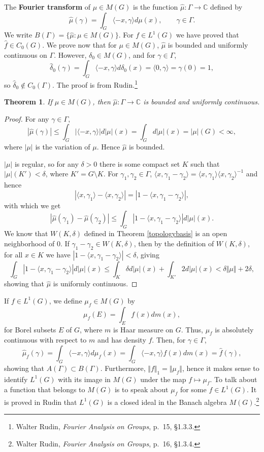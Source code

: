 \documentclass{article}
\newcommand{\inner}[2]{\langle #1, #2 \rangle}
\newcommand{\norm}[1]{\Vert #1 \Vert}
\newtheorem{theorem}{Theorem}
\begin{document}
The \textbf{Fourier transform} of $\mu \in M(G)$ is the function $\hat{\mu}:\Gamma \to \mathbb{C}$ defined by
\[
\hat{\mu}(\gamma) = \int_G \inner{-x}{\gamma} d\mu(x), \qquad \gamma \in \Gamma.
\]
We write $B(\Gamma)=\{\hat{\mu}:\mu \in M(G)\}$.
For $f \in L^1(G)$ we have proved that $\hat{f} \in C_0(G)$. We prove now that for $\mu \in M(G)$, $\hat{\mu}$ is bounded and uniformly continuous
on $\Gamma$. However, $\delta_0 \in M(G)$, and for $\gamma \in \Gamma$,
\[
\hat{\delta}_0(\gamma) = \int_G \inner{-x}{\gamma} d\delta_0(x) = \inner{0}{\gamma} = \gamma(0) = 1,
\] 
so $\hat{\delta}_0 \not \in C_0(\Gamma)$. The proof is from Rudin.\footnote{Walter Rudin, {\em Fourier Analysis on Groups},
p.~15, \S 1.3.3.}

\begin{theorem}
If $\mu \in M(G)$, then $\hat{\mu}:\Gamma \to \mathbb{C}$ is bounded and uniformly continuous.
\end{theorem}
\begin{proof}
For any $\gamma \in \Gamma$, 
\[
|\hat{\mu}(\gamma)| \leq \int_G |\inner{-x}{\gamma}| d|\mu|(x) = \int_G d|\mu|(x) = |\mu|(G)<\infty,
\]
where $|\mu|$ is the variation of $\mu$. Hence $\hat{\mu}$ is bounded.

$|\mu|$ is regular, so for any $\delta>0$ there is some compact set $K$ such that $|\mu|(K')<\delta$, where $K'=G \setminus K$.
For $\gamma_1,\gamma_2 \in \Gamma$,  $\inner{x}{\gamma_1-\gamma_2}=\inner{x}{\gamma_1} \inner{x}{\gamma_2}^{-1}$ and hence
\[
|\inner{x}{\gamma_1}-\inner{x}{\gamma_2}| = |1- \inner{x}{\gamma_1-\gamma_2}|,
\]
with which we get
\[
|\hat{\mu}(\gamma_1)-\hat{\mu}(\gamma_2)| \leq \int_G |1- \inner{x}{\gamma_1-\gamma_2}| d|\mu|(x).
\]
We know that $W(K,\delta)$ defined in Theorem \ref{topologybasis} is an open neighborhood of $0$. If $\gamma_1-\gamma_2 \in
W(K,\delta)$, then by the definition of $W(K,\delta)$, for all $x \in K$ we have $|1-\inner{x}{\gamma_1-\gamma_2}|<\delta$, giving
\[
\int_G |1- \inner{x}{\gamma_1-\gamma_2}| d|\mu|(x) \leq \int_K \delta d|\mu|(x) + \int_{K'} 2 d|\mu|(x)<\delta \norm{\mu} + 2\delta,
\]
showing that $\hat{\mu}$ is uniformly continuous.


\end{proof}

If $f \in L^1(G)$, we define $\mu_f \in M(G)$ by
\[
\mu_f(E) = \int_E f(x) dm(x),
\]
for Borel subsets $E$ of $G$, where $m$ is Haar measure on $G$. Thus, $\mu_f$ is absolutely continuous with respect
to $m$ and has density $f$. Then, for $\gamma \in \Gamma$,
\[
\hat{\mu}_f(\gamma) = \int_G \inner{-x}{\gamma} d\mu_f(x) = \int_G \inner{-x}{\gamma} f(x) dm(x) = \hat{f}(\gamma),
\]
showing that $A(\Gamma) \subset B(\Gamma)$. Furthermore, $\norm{f}_1 = \norm{\mu_f}$, hence it makes sense to
identify $L^1(G)$ with its image in $M(G)$ under the map $f \mapsto \mu_f$. 
To talk about a function that belongs to $M(G)$ is to speak about $\mu_f$ for some $f \in L^1(G)$.  It is proved in Rudin
that $L^1(G)$ is a closed ideal in the Banach algebra $M(G)$.\footnote{Walter Rudin, {\em Fourier Analysis on Groups},
p.~16, \S 1.3.4.}
\end{document}
